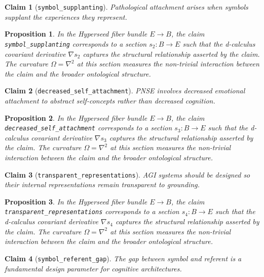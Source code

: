 \documentclass{article}
\newtheorem{claim}{Claim}
\newtheorem{proposition}{Proposition}
\begin{document}
\begin{claim}[\texttt{symbol_supplanting}]
Pathological attachment arises when symbols supplant the experiences they represent.
\end{claim}

\begin{proposition}
In the Hyperseed fiber bundle $E \to B$, the claim \texttt{symbol_supplanting} corresponds to a section $s_2: B \to E$ such that the d-calculus covariant derivative $\nabla s_2$ captures the structural relationship asserted by the claim. The curvature $\Omega = \nabla^2$ at this section measures the non-trivial interaction between the claim and the broader ontological structure.
\end{proposition}

\begin{claim}[\texttt{decreased_self_attachment}]
PNSE involves decreased emotional attachment to abstract self-concepts rather than decreased cognition.
\end{claim}

\begin{proposition}
In the Hyperseed fiber bundle $E \to B$, the claim \texttt{decreased_self_attachment} corresponds to a section $s_3: B \to E$ such that the d-calculus covariant derivative $\nabla s_3$ captures the structural relationship asserted by the claim. The curvature $\Omega = \nabla^2$ at this section measures the non-trivial interaction between the claim and the broader ontological structure.
\end{proposition}

\begin{claim}[\texttt{transparent_representations}]
AGI systems should be designed so their internal representations remain transparent to grounding.
\end{claim}

\begin{proposition}
In the Hyperseed fiber bundle $E \to B$, the claim \texttt{transparent_representations} corresponds to a section $s_4: B \to E$ such that the d-calculus covariant derivative $\nabla s_4$ captures the structural relationship asserted by the claim. The curvature $\Omega = \nabla^2$ at this section measures the non-trivial interaction between the claim and the broader ontological structure.
\end{proposition}

\begin{claim}[\texttt{symbol_referent_gap}]
The gap between symbol and referent is a fundamental design parameter for cognitive architectures.
\end{claim}
\end{document}
